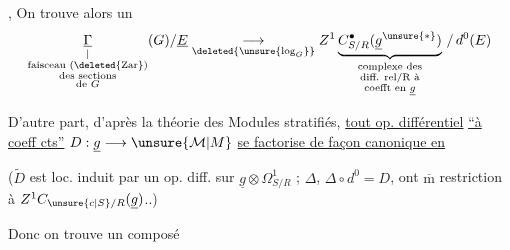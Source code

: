 , On trouve alors un 
\[
\underset{\substack{\vert\\\text{faisceau }(\deleted{\text{Zar}})\\
 \text{des sections}\\\text{de }G}}{\underline{\Gamma}}(G)/\underline E
\underset{\deleted{\unsure{\log_G}}}{\longrightarrow}
Z^1\underbrace{C_{S/R}^{\bullet}(\underline g^{\unsure{*}})}_{
 \substack{\text{complexe des}\\\text{diff. rel/R à}\\\text{coefft en }\underline g}}
\,/\,d^0(E)
\]

D'autre part, d'après la théorie des Modules stratifiés, \uline{tout op. différentiel} \uline{``à coeff cts''} $D:\underline g\longrightarrow \unsure{\mathcal M|M}$
 \uline{se factorise de façon canonique en}

($\widetilde D$ est loc. induit par un op. diff. sur $\underline g\otimes\Omega^1_{S/R}$ ;   $\Delta$,   $\Delta\circ d^0=D$, ont $\overline{\mathrm m}$ restriction à $Z^1C_{\unsure{c|S}/R}(\underline g)$..)

Donc on trouve un composé
